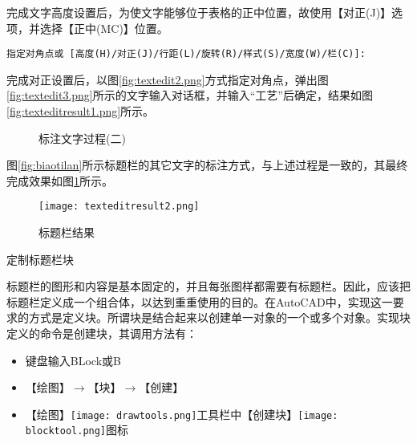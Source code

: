 \begin{procedure}
完成文字高度设置后，为使文字能够位于表格的正中位置，故使用【对正(J)】选项，并选择【正中(MC)】位置。
\begin{lstlisting}
指定对角点或 [高度(H)/对正(J)/行距(L)/旋转(R)/样式(S)/宽度(W)/栏(C)]:
\end{lstlisting}

完成对正设置后，以图\ref{fig:textedit2.png}方式指定对角点，弹出图\ref{fig:textedit3.png}所示的文字输入对话框，并输入“工艺”后确定，结果如图\ref{fig:texteditresult1.png}所示。
\begin{figure}[htbp]
\centering
{}\hspace{20pt}
\caption{标注文字过程(二)}
\end{figure}

图\ref{fig:biaotilan}所示标题栏的其它文字的标注方式，与上述过程是一致的，其最终完成效果如图\ref{fig:texteditresult2.png}所示。
\begin{figure}[htbp]
\centering
\texttt{[image: texteditresult2.png]}
\caption{标题栏结果}\label{fig:texteditresult2.png}
\end{figure}
\item 定制标题栏块

标题栏的图形和内容是基本固定的，并且每张图样都需要有标题栏。因此，应该把标题栏定义成一个组合体，以达到重重使用的目的。在AutoCAD中，实现这一要求的方式是定义块。所谓块是结合起来以创建单一对象的一个或多个对象。实现块定义的命令是创建块，其调用方法有：
\begin{itemize}
\item 键盘输入BLock或B
\item 【绘图】$\rightarrow$【块】$\rightarrow$【创建】
\item 【绘图】\texttt{[image: drawtools.png]}工具栏中【创建块】\texttt{[image: blocktool.png]}图标
\end{itemize}


\end{procedure}
